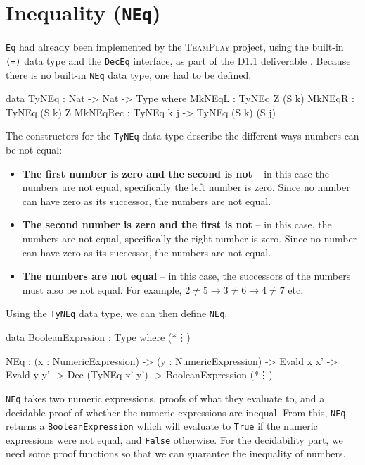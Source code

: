 \section{Inequality (\texttt{NEq})}
    \texttt{Eq} had already been implemented by the \textsc{TeamPlay} project, using the built-in \texttt{(=)} data type and the \texttt{DecEq} interface, as part of the D1.1 deliverable \cite{teamplay:d1.1}. Because there is no built-in \texttt{NEq} data type, one had to be defined.
    \begin{code}[caption={The data type used for capturing inequality}]
        data TyNEq : Nat -> Nat -> Type where
            MkNEqL   : TyNEq Z (S k)
            MkNEqR   : TyNEq (S k) Z
            MkNEqRec : TyNEq k j -> TyNEq (S k) (S j)
    \end{code}
    The constructors for the \texttt{TyNEq} data type describe the different ways numbers can be not equal:
    \begin{itemize}
        \item \textbf{The first number is zero and the second is not} -- in this case the numbers are not equal, specifically the left number is zero. Since no number can have zero as its successor, the numbers are not equal.
        \item \textbf{The second number is zero and the first is not} -- in this case, the numbers are not equal, specifically the right number is zero. Since no number can have zero as its successor, the numbers are not equal.
        \item \textbf{The numbers are not equal} -- in this case, the successors of the numbers must also be not equal. For example, $2 \neq 5 \rightarrow 3 \neq 6 \rightarrow 4 \neq 7$ etc.
    \end{itemize}
    Using the \texttt{TyNEq} data type, we can then define \texttt{NEq}.
    \begin{code}[label={des:neq-code}, caption={The definition of \texttt{NEq}}, escapeinside={(*}{*)}]
        data BooleanExprssion : Type where
            (*\vdots*)
            
            NEq :  (x : NumericExpression)
                -> (y : NumericExpression)
                -> Evald x x'
                -> Evald y y'
                -> Dec (TyNEq x' y')
                -> BooleanExpression
            (*\vdots*)
    \end{code}
    
    \texttt{NEq} takes two numeric expressions, proofs of what they evaluate to, and a decidable proof of whether the numeric expressions are inequal. From this, \texttt{NEq} returns a \texttt{BooleanExpression} which will evaluate to \texttt{True} if the numeric expressions were not equal, and \texttt{False} otherwise. For the decidability part, we need some proof functions so that we can guarantee the inequality of numbers.
    
